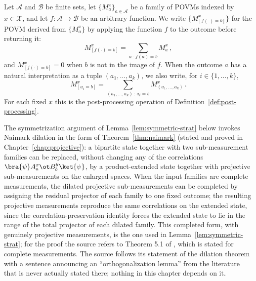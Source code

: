 \begin{definition}\label{def:bracket}
	\leanok
	Let $\mathcal A$ and $\mathcal B$ be finite sets, let $\{M^x_a\}_{a \in \mathcal A}$ be a family of POVMs indexed by $x \in \mathcal X$, and let $f \colon \mathcal A \to \mathcal B$ be an arbitrary function. We write $\bigl\{ M^x_{[f(\cdot)=b]} \bigr\}$ for the POVM derived from $\{M^x_a\}$ by applying the function $f$ to the outcome before returning it:
	\[
		M^x_{[f(\cdot)=b]} = \sum_{a\,:\,f(a)=b} M^x_a\,,
	\]
	and $M^x_{[f(\cdot)=b]} = 0$ when $b$ is not in the image of $f$. When the outcome $a$ has a natural interpretation as a tuple $(a_1,\dots,a_k)$, we also write, for $i \in \{1,\dots,k\}$,
	\[
		M^x_{[a_i=b]} = \sum_{(a_1,\dots,a_k)\,:\,a_i=b} M^x_{(a_1,\dots,a_k)}\,.
	\]
	For each fixed $x$ this is the post-processing operation of Definition~\ref{def:post-processing}.
\end{definition}

\begin{remark}\label{rem:naimark-for-games}
	The symmetrization argument of Lemma~\ref{lem:symmetric-strat} below invokes Naimark dilation in the form of Theorem~\ref{thm:naimark} (stated and proved in Chapter~\ref{chap:projective}): a bipartite state together with two sub-measurement families can be replaced, without changing any of the correlations $\bra{\psi} A^x_a \ot B^y_b \ket{\psi}$, by a product-extended state together with projective sub-measurements on the enlarged spaces. When the input families are complete measurements, the dilated projective sub-measurements can be completed by assigning the residual projector of each family to one fixed outcome; the resulting projective measurements reproduce the same correlations on the extended state, since the correlation-preservation identity forces the extended state to lie in the range of the total projector of each dilated family. This completed form, with genuinely projective measurements, is the one used in Lemma~\ref{lem:symmetric-strat}; for the proof the source refers to Theorem 5.1 of \cite{Ji2020LowIndividualDegree}, which is stated for complete measurements. The source follows its statement of the dilation theorem with a sentence announcing an ``orthogonalization lemma'' from the literature that is never actually stated there; nothing in this chapter depends on it.
\end{remark}

